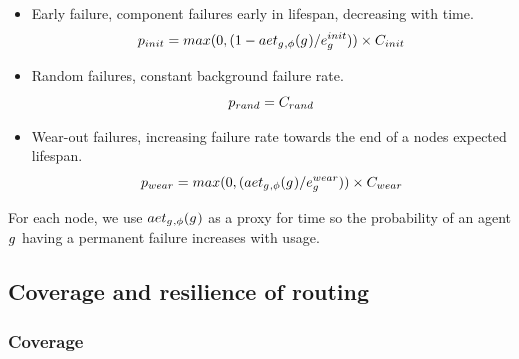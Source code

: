 	
\begin{itemize}
	\item Early failure, component failures early in lifespan, decreasing with time.
	\begin{equation}
		\varProbability{init}{} = max(0, (1 - \functionAgentEnergyTotal{}{}/\varEnergy{}{init})) \times C_{init}
	\end{equation}
	\item Random failures, constant background failure rate.
	\begin{equation}
		\varProbability{rand}{} = C_{rand}
	\end{equation}
	\item Wear-out failures, increasing failure rate towards the end of a nodes expected lifespan.
	\begin{equation}
		\varProbability{wear}{} = max(0, ( \functionAgentEnergyTotal{}{}/\varEnergy{}{wear}))\times C_{wear}
	\end{equation}
\end{itemize}
For each node, we use $\functionAgentEnergyTotal{}{}$ as a proxy for time so the probability of an agent $g_{}^{}$ having a permanent failure increases with usage.


\subsection{Coverage and resilience of routing}

\subsubsection{Coverage}

